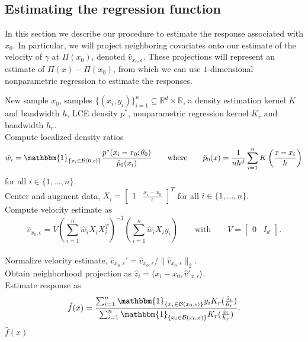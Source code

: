 \documentclass[11pt]{article}
\begin{document}
\subsection{Estimating the regression function}

In this section we describe our procedure to estimate the response associated with $x_0$. In particular, we will project neighboring covariates onto our estimate of the velocity of $\gamma$ at $\Pi(x_0)$, denoted $\hat v_{x_0, \epsilon}$. These projections will represent an estimate of $\Pi(x) - \Pi(x_0)$, from which we can use $1$-dimensional nonparametric regression to estimate the responses.

\begin{algorithm}[h]
    \begin{algorithmic}[1]
        \caption{Locally Linear Single Index Regression (LLSIR)}
        \label{alg: LLSIR}
        \Require New sample $x_0$, samples $\{(x_i, y_i)\}_{i=1}^n \subseteq \mathbb{R}^d \times \mathbb{R}$, a density estimation kernel $K$ and bandwidth $h$, LCE density $p^*$, nonparametric regression kernel $K_r$ and bandwidth $h_r$.\\
        Compute localized density ratios \[\hat{w}_i = \mathbbm{1}_{\{x_i \in \mathcal{B}(0, \epsilon)\}}\frac{p^*(x_i - x_0; \theta_0)}{\hat p_0(x_i)} \qquad \text{where} \qquad \hat p_0(x) = \frac{1}{nh^d}\sum_{i = 1}^nK\left(\frac{x -x_i}{h}\right)\]for all $i \in \{1, \dots, n\}$. \\
        Center and augment data, $X_i = \begin{bmatrix}
            1 & \frac{x_i - x_0}{\epsilon}
        \end{bmatrix}^T$ for all $i \in \{1, \dots , n\}.$ \\
        Compute velocity estimate as 
        \[ \hat{v}_{x_0, \epsilon} = V\left(\sum_{i = 1}^n\hat{w}_iX_iX_i^T\right)^{-1}\left(\sum_{i = 1}^n\hat{w}_iX_iy_i\right) \qquad \text{with} \qquad V = \begin{bmatrix}
            0 & I_d
        \end{bmatrix}.\] \\
        Normalize velocity estimate, $\hat v_{x_0, \epsilon}' = \hat v_{x_0, \epsilon} /\|\hat v_{x_0, \epsilon}\|_2$.\\
        Obtain neighborhood projection as $\hat{z}_i = \langle x_i - x_0, \hat{v}'_{x, \epsilon} \rangle$. \\
        Estimate response as 
        \begin{equation} \label{eq: kernel regressor}
            \hat{f}(x) = \frac{\sum_{i=1}^n \mathbbm{1}_{\{x_i\in \mathcal{B}(x_0, \epsilon)\}}y_iK_r(\frac{\hat{z}_i}{h_r})}{\sum_{i=1}^n \mathbbm{1}_{\{x_i\in \mathcal{B}(x_0, \epsilon)\}}K_r(\frac{\hat{z}_i}{h_r})}.
        \end{equation}
        \Return $\hat{f}(x)$
    \end{algorithmic}
\end{algorithm}
\end{document}
